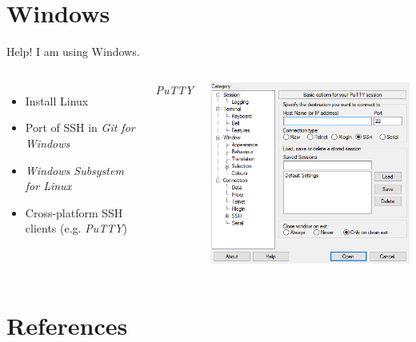 \documentclass[10pt, graphics, aspectratio=169, table]{beamer}
\begin{document}
\section{Windows}
\begin{frame}[fragile]{Help! I am using Windows.}
	\begin{columns}
		\begin{itemize}
			\item Install Linux
			\item Port of SSH in \emph{Git for Windows}
			\item \emph{Windows Subsystem for Linux}
			\item Cross-platform SSH clients (e.g. \emph{PuTTY})
		\end{itemize}
		\centering
		\emph{PuTTY} \cite{putty}

		\includegraphics[height=0.65\paperheight]{img/putty.png}
	\end{columns}
\end{frame}

\section{References}
\begin{frame}[allowframebreaks]
	\printbibliography[heading=none]
\end{frame}
\end{document}
